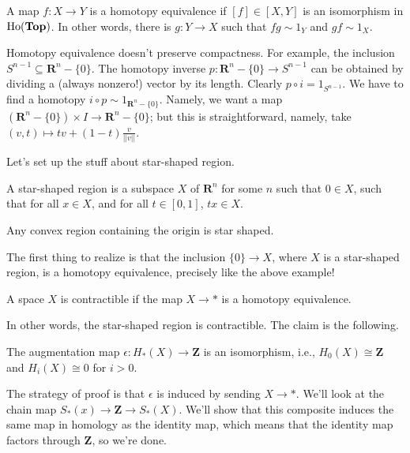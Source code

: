 \begin{definition}
A map $f:X\to Y$ is a homotopy equivalence if $[f]\in[X,Y]$ is an isomorphism in $\mathrm{Ho}(\mathbf{Top})$. In other words, there is $g:Y\to X$ such that $fg\sim 1_Y$ and $gf\sim 1_X$.
\end{definition}
\begin{example}
Homotopy equivalence doesn't preserve compactness. For example, the inclusion $S^{n-1}\subseteq \mathbf{R}^n-\{0\}$. The homotopy inverse $p:\mathbf{R}^n-\{0\}\to S^{n-1}$ can be obtained by dividing a (always nonzero!) vector by its length. Clearly $p\circ i=1_{S^{n-1}}$. We have to find a homotopy $i\circ p\sim 1_{\mathbf{R}^n-\{0\}}$. Namely, we want a map $(\mathbf{R}^n-\{0\})\times I\to \mathbf{R}^n-\{0\}$; but this is straightforward, namely, take $(v,t)\mapsto tv+(1-t)\frac{v}{||v||}$.
\end{example}
Let's set up the stuff about star-shaped region.
\begin{definition}
A star-shaped region is a subspace $X$ of $\mathbf{R}^n$ for some $n$ such that $0\in X$, such that for all $x\in X$, and for all $t\in[0,1]$, $tx\in X$. 
\end{definition}
\begin{example}
Any convex region containing the origin is star shaped.
\end{example}

The first thing to realize is that the inclusion $\{0\}\to X$, where $X$ is a star-shaped region, is a homotopy equivalence, precisely like the above example!
\begin{definition}
A space $X$ is contractible if the map $X\to\ast$ is a homotopy equivalence.
\end{definition}
In other words, the star-shaped region is contractible. The claim is the following.
\begin{theorem}
The augmentation map $\epsilon: H_\ast(X)\to \mathbf{Z}$ is an isomorphism, i.e., $ H_0(X)\cong\mathbf{Z}$ and $ H_i(X)\cong 0$ for $i>0$.
\end{theorem}
The strategy of proof is that $\epsilon$ is induced by sending $X\to \ast$. We'll look at the chain map $S_\ast(x)\to\mathbf{Z}\to S_\ast(X)$. We'll show that this composite induces the same map in homology as the identity map, which means that the identity map factors through $\mathbf{Z}$, so we're done.

